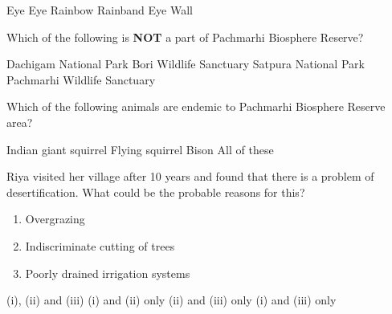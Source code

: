 \begin{questions}
    \begin{randomizeoneparchoices}
        \CorrectChoice Eye
        \choice Eye Rainbow
        \choice Rainband
        \choice Eye Wall
    \end{randomizeoneparchoices}


\question Which of the following is \textbf{NOT} a part of Pachmarhi Biosphere Reserve?

    \begin{randomizeoneparchoices}
        \CorrectChoice Dachigam National Park
        \choice Bori Wildlife Sanctuary
        \choice Satpura National Park
        \choice Pachmarhi Wildlife Sanctuary
    \end{randomizeoneparchoices}

    \question Which of the following animals are endemic to Pachmarhi Biosphere Reserve area?

    \begin{choices}
        \choice Indian giant squirrel
        \choice Flying squirrel
        \choice Bison
        \CorrectChoice All of these
    \end{choices}

    \question Riya visited her village after 10 years and found that there is a problem of desertification. What could be the probable reasons for this?
    \begin{enumerate}[align=left,label=\roman*.]
        \item Overgrazing
        \item Indiscriminate cutting of trees
        \item Poorly drained irrigation systems
    \end{enumerate}
    \begin{randomizeoneparchoices}
        \CorrectChoice (i), (ii) and (iii)
        \choice (i) and (ii) only
        \choice (ii) and (iii) only
        \choice (i) and (iii) only
    \end{randomizeoneparchoices}


\end{questions}
